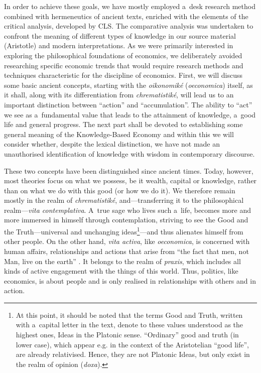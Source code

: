 In order to achieve these goals, we have mostly employed a~desk research method combined with hermeneutics of ancient texts, enriched with the elements of the critical analysis, developed by CLS. The comparative analysis was undertaken to confront the meaning of different types of knowledge in our source material (Aristotle) and modern interpretations. As we were primarily interested in exploring the philosophical foundations of economics, we deliberately avoided researching specific economic trends that would require research methods and techniques characteristic for the discipline of economics. First, we will discuss some basic ancient concepts, starting with the \textit{oikonomiké} (\textit{oeconomica}) itself, as it shall, along with its differentiation from \textit{chrematistiké}, will lead us to an important distinction between ``action'' and ``accumulation''. The ability to ``act'' we see as a~fundamental value that leads to the attainment of knowledge, a~good life and general progress. The next part shall be devoted to establishing some general meaning of the Knowledge-Based Economy and within this we will consider whether, despite the lexical distinction, we have not made an unauthorised identification of knowledge with wisdom in contemporary discourse.



These two concepts have been distinguished since ancient times. Today, however, most theories focus on what we possess, be it wealth, capital or knowledge, rather than on what we do with this good (or how we do it). We therefore remain mostly in the realm of \textit{chrematistiké}, and---transferring it to the philosophical realm---\textit{vita contemplativa}. A~true sage who lives such a~life, becomes more and more immersed in himself through contemplation, striving to see the Good and the Truth---universal and unchanging ideas\footnote{At this point, it should be noted that the terms Good and Truth, written with a~capital letter in the text, denote to these values understood as the highest ones, Ideas in the Platonic sense. ``Ordinary'' good and truth (in lower case), which appear e.g. in the context of the Aristotelian ``good life'', are already relativised. Hence, they are not Platonic Ideas, but only exist in the realm of opinion (\textit{doxa}).}---and thus alienates himself from other people. On the other hand, \textit{vita activa}, like \textit{oeconomica}, is concerned with human affairs, relationships and actions that arise from ``the fact that men, not Man, live on the earth'' 
\parencite[][p.7]{arendt_human_1998}. %
 It belongs to the realm of \textit{praxis}, which includes all kinds of active engagement with the things of this world. Thus, politics, like economics, is about people and is only realised in relationships with others and in action.



